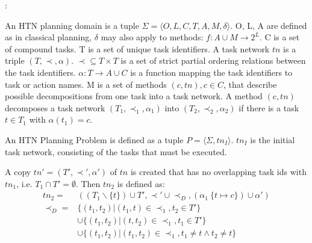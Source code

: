 \cite{hollerGuidingSearchHTN2019}:

\begin{definition}
  An HTN planning domain is a tuple $\Sigma=\langle O, L, C, T, A, M, \delta \rangle$.
  O, L, A are defined as in classical planning, $\delta$ may also apply to methods: $f : A \cup M \rightarrow 2^L$.
  C is a set of compound tasks.
  T is a set of unique task identifiers.
  A task network $tn$ is a triple $(T,\prec,\alpha)$.
  $\prec \subseteq T \times T$ is a set of strict partial ordering relations between the task identifiers.
  $\alpha : T \rightarrow A \cup C$ is a function mapping the task identifiers to task or action names.
  M is a set of methods $(c,tn), c \in C$, that describe possible decompositions from one task into a task network.
  A method $(c,tn)$ decomposes a task network $(T_1,\prec_1,\alpha_1)$ into $(T_2,\prec_2,\alpha_2)$ if there is a task $t \in T_1$ with $\alpha(t_1) = c$.
\end{definition}

\begin{definition}
  An HTN Planning Problem is defined as a tuple $P=\langle \Sigma, tn_I \rangle$.
  $tn_I$ is the initial task network, consisting of the tasks that must be executed.
\end{definition}

\begin{definition}
  A copy $tn' = (T',\prec',\alpha')$ of $tn$ is created that has no overlapping task ids with $tn_1$, i.e. $T_1 \cap T' = \emptyset$.
  Then $tn_2$ is defined as:
  \begin{align*}
    tn_2 = & ((T_1 \backslash  \{t\}) \cup T', \prec' \cup \prec_D, (\alpha_1 \ \{t \mapsto c\}) \cup \alpha') \\
    \prec_D = & \{(t_1, t_2) | (t_1, t) \in \prec_1, t_2 \in T'\} \\
    &\cup  \{(t_1, t_2) | (t, t_2) \in \prec_1, t_1 \in T '\} \\
    &\cup  \{(t_1, t_2) | (t_1, t_2) \in \prec_1, t_1 \neq t \land t_2 \neq t\}\\
  \end{align*}
\end{definition}




